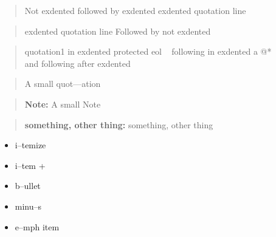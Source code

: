 \documentclass{book}
\begin{document}
\begin{quote}
Not exdented followed by exdented
exdented quotation line
\end{quote}

\begin{quote}
exdented quotation line
Followed by not exdented 
\end{quote}

\begin{quote}
quotation1
in exdented protected eol \ {}
following
in exdented a @* \leavevmode{}\\ and following
after exdented
\end{quote}

\begin{quote}
\begin{footnotesize}
A small quot---ation
\end{footnotesize}
\end{quote}

\begin{quote}
\begin{footnotesize}
\textbf{Note:} A small Note
\end{footnotesize}
\end{quote}

\begin{quote}
\begin{footnotesize}
\textbf{something, other thing:} something, other thing
\end{footnotesize}
\end{quote}

\begin{itemize}
\item i--temize
\end{itemize}

\begin{itemize}[label=+]
\item i--tem +
\end{itemize}

\begin{itemize}[label=\textbullet{}]
\item b--ullet
\end{itemize}

\begin{itemize}[label=-]
\item minu--s
\end{itemize}

\begin{itemize}[label=\emph{after emph}]
\item e--mph item
\end{itemize}
\end{document}
